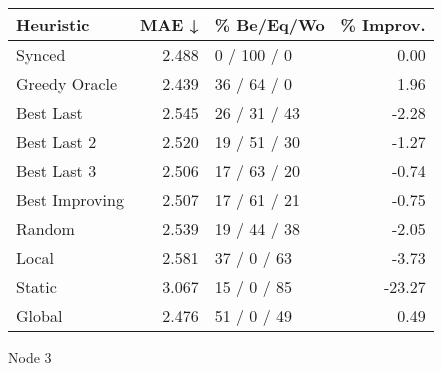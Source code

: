 \begin{tabular}{lrlr}
\toprule
\textbf{Heuristic} & \textbf{MAE ↓} & \textbf{\% Be/Eq/Wo} & \textbf{\% Improv.} \\
\midrule
            Synced &          2.488 &          0 / 100 / 0 &                0.00 \\
     Greedy Oracle &          2.439 &          36 / 64 / 0 &                1.96 \\
         Best Last &          2.545 &         26 / 31 / 43 &               -2.28 \\
       Best Last 2 &          2.520 &         19 / 51 / 30 &               -1.27 \\
       Best Last 3 &          2.506 &         17 / 63 / 20 &               -0.74 \\
    Best Improving &          2.507 &         17 / 61 / 21 &               -0.75 \\
            Random &          2.539 &         19 / 44 / 38 &               -2.05 \\
             Local &          2.581 &          37 / 0 / 63 &               -3.73 \\
            Static &          3.067 &          15 / 0 / 85 &              -23.27 \\
            Global &          2.476 &          51 / 0 / 49 &                0.49 \\
\bottomrule
\end{tabular}
\caption{Node 3}
\label{tab:hr_iid_lr05_le1_bs4_3}
